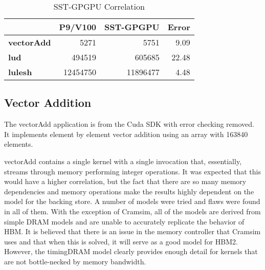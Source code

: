    \begin{table}[!htbp]
      \centering
      \setlength{\belowcaptionskip}{6pt plus 1pt minus 1pt}
      \captionsetup{width=.75\textwidth}
      \caption{SST-GPGPU Correlation}
      \begin{tabular}{l|r|r|r|}
         \cline{2-4}
                                                & \multicolumn{1}{c|}{\textbf{P9/V100}} & \multicolumn{1}{c|}{\textbf{SST-GPGPU}} & \multicolumn{1}{c|}{\textbf{Error}} \\ \hline
         \multicolumn{1}{|l|}{\textbf{vectorAdd}} & 5271                                  & 5751                                    & 9.09                              \\ \hline
         \multicolumn{1}{|l|}{\textbf{lud}}       & 494519                                & 605685                                  & 22.48                             \\ \hline
         \multicolumn{1}{|l|}{\textbf{lulesh}}    & 12454750                              & 11896477                                & 4.48                              \\ \hline
         \end{tabular}
      \label{tab:correlation}
   \end{table}


\subsection{Vector Addition}
\label{sec:vecadd}
The vectorAdd application is from the Cuda SDK with error checking removed. It
implements element by element vector addition using an array with 163840
elements.

vectorAdd contains a single kernel with a single invocation that, essentially,
streams through memory performing integer operations. It was expected that this
would have a higher correlation, but the fact that there are so many memory
dependencies and memory operations make the results highly dependent on the
model for the backing store. A number of models were tried and flaws were found
in all of them. With the exception of Cramsim, all of the models are derived
from simple DRAM models and are unable to accurately replicate the behavior of
HBM. It is believed that there is an issue in the memory controller that Cramsim
uses and that when this is solved, it will serve as a good model for HBM2. However,
the timingDRAM model clearly provides enough detail for kernels that are not
bottle-necked by memory bandwidth.


